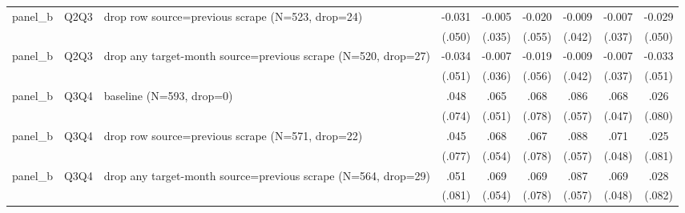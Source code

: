 \begin{tabular}{lllcccccc}
\\
panel\_b & Q2Q3 & drop row source=previous scrape (N=523, drop=24) & -0.031 & -0.005 & -0.020 & -0.009 & -0.007 & -0.029
\\
 &  &  & (.050) & (.035) & (.055) & (.042) & (.037) & (.050)
\\
panel\_b & Q2Q3 & drop any target-month source=previous scrape (N=520, drop=27) & -0.034 & -0.007 & -0.019 & -0.009 & -0.007 & -0.033
\\
 &  &  & (.051) & (.036) & (.056) & (.042) & (.037) & (.051)
\\
panel\_b & Q3Q4 & baseline (N=593, drop=0) & .048 & .065 & .068 & .086 & .068 & .026
\\
 &  &  & (.074) & (.051) & (.078) & (.057) & (.047) & (.080)
\\
panel\_b & Q3Q4 & drop row source=previous scrape (N=571, drop=22) & .045 & .068 & .067 & .088 & .071 & .025
\\
 &  &  & (.077) & (.054) & (.078) & (.057) & (.048) & (.081)
\\
panel\_b & Q3Q4 & drop any target-month source=previous scrape (N=564, drop=29) & .051 & .069 & .069 & .087 & .069 & .028
\\
 &  &  & (.081) & (.054) & (.078) & (.057) & (.048) & (.082)
\\
\hline
\end{tabular}
